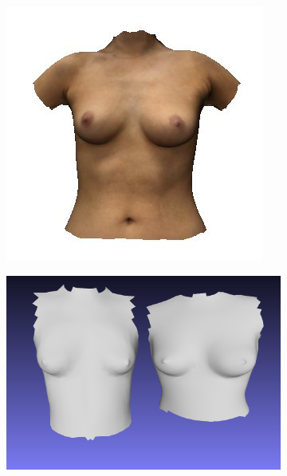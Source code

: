 \begin{figure}
\centering
\begin{subfigure}{.25\textwidth}
  \centering
  \includegraphics[width=1.05\linewidth]{figures/sprite57}
\end{subfigure}%
\begin{subfigure}{.37\textwidth}
  \centering
  \includegraphics[width=1.1\linewidth]{figures/fitted57_cropped}
\end{subfigure}
\begin{subfigure}{.37\textwidth}

\end{subfigure}
\end{figure}
